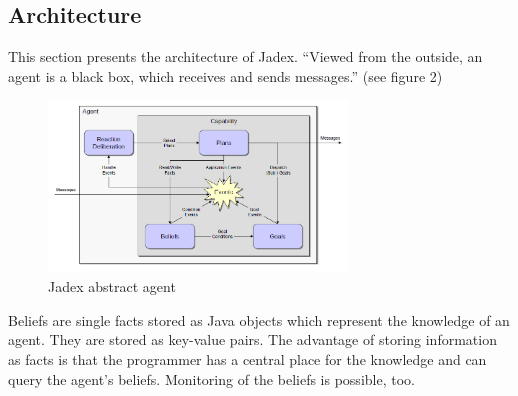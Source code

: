 \subsection{Architecture}
This section presents the architecture of Jadex. "`Viewed from the outside, an agent is a black box, which receives and sends messages."' \cite{Pokahr} (see figure 2)
\begin{figure}
	\centering
	\includegraphics[width=300px]{images/Jadex_agent.png}
	\caption{Jadex abstract agent \cite{Pokahr}}
	\label{fig2}
\end{figure}
Beliefs are single facts stored as Java objects which represent the knowledge of an agent. They are stored as key-value pairs. The advantage of storing information as facts is that the programmer has a central place for the knowledge and can query the agent's beliefs. Monitoring of the beliefs is possible, too. 
